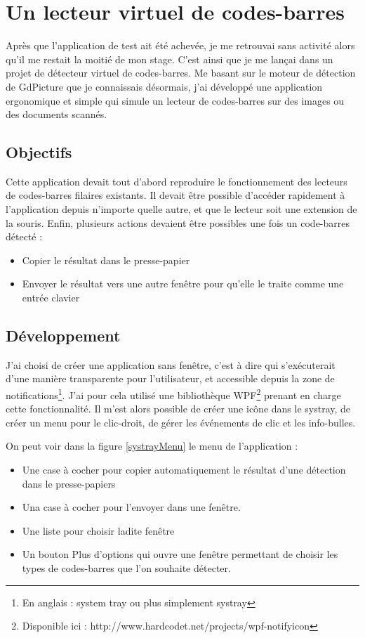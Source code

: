 \chapter{Un lecteur virtuel de codes-barres}

Après que l'application de test ait été achevée, je me retrouvai sans activité alors qu'il me restait la moitié de mon stage.
C'est ainsi que je me lançai dans un projet de détecteur virtuel de codes-barres.
Me basant sur le moteur de détection de GdPicture que je connaissais désormais, j'ai développé une application ergonomique et simple qui simule un lecteur de codes-barres sur des images ou des documents scannés.

\section{Objectifs}

Cette application devait tout d'abord reproduire le fonctionnement des lecteurs de codes-barres filaires existants.
Il devait être possible d'accéder rapidement à l'application depuis n'importe quelle autre, et que le lecteur soit une extension de la souris.
Enfin, plusieurs actions devaient être possibles une fois un code-barres détecté :
\begin{itemize}
\item Copier le résultat dans le presse-papier
\item Envoyer le résultat vers une autre fenêtre pour qu'elle le traite comme une entrée clavier
\end{itemize}

\section{Développement}

J'ai choisi de créer une application sans fenêtre, c'est à dire qui s'exécuterait d'une manière transparente pour l'utilisateur, et accessible depuis la zone de notifications\footnote{En anglais : \og system tray \fg{} ou plus simplement \og systray \fg{}}.
J'ai pour cela utilisé une bibliothèque WPF\footnote{Disponible ici : http://www.hardcodet.net/projects/wpf-notifyicon} prenant en charge cette fonctionnalité. Il m'est alors possible de créer une icône dans le systray, de créer un menu pour le clic-droit, de gérer les événements de clic et les info-bulles.

On peut voir dans la figure \ref{systrayMenu} le menu de l'application :
\begin{itemize}
\item Une case à cocher pour copier automatiquement le résultat d'une détection dans le presse-papiers
\item Una case à cocher pour l'envoyer dans une fenêtre.
\item Une liste pour choisir ladite fenêtre
\item Un bouton \og Plus d'options \fg{} qui ouvre une fenêtre permettant de choisir les types de codes-barres que l'on souhaite détecter.
\end{itemize}

